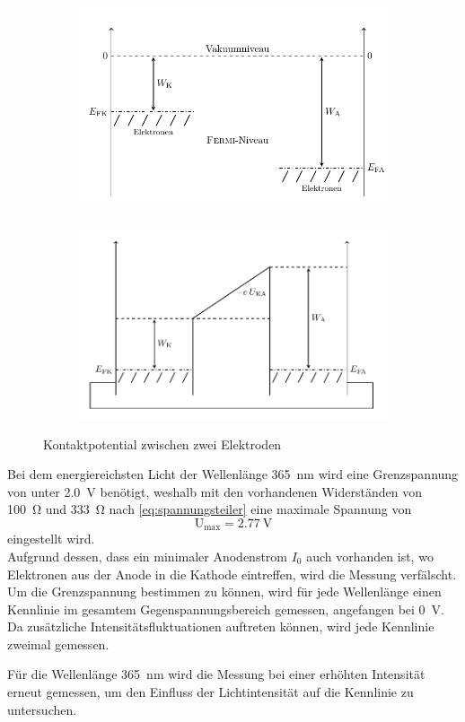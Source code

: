 \begin{figure}[htb]
	\centering
	\begin{subfigure}[c]{0.46\linewidth}
		\includegraphics[width=\linewidth]{../figs/fermi1.png}
	\end{subfigure}
	\begin{subfigure}[c]{0.46\linewidth}
		\includegraphics[width=\linewidth]{../figs/fermi2.png}
	\end{subfigure}
	\caption{Kontaktpotential zwischen zwei Elektroden\cite{skript}}
\end{figure}

Bei dem energiereichsten Licht der Wellenlänge \SI{365}{\nano\meter} wird eine Grenzspannung von unter
\SI{2.0}{\volt} benötigt, weshalb mit den vorhandenen Widerständen von \SI{100}{\ohm} und \SI{333}{\ohm}
nach \cref{eq:spannungsteiler} eine maximale Spannung von
\[\mathrm U_\mathrm{max} = \SI{2.77}{\volt}\]
eingestellt wird.\\
Aufgrund dessen, dass ein minimaler Anodenstrom $I_0$ auch vorhanden ist, wo Elektronen aus der
Anode in die Kathode eintreffen, wird die Messung verfälscht. Um die Grenzspannung bestimmen zu können,
wird für jede Wellenlänge einen Kennlinie im gesamtem Gegenspannungsbereich gemessen, angefangen
bei \SI{0}{\volt}. Da zusätzliche Intensitätsfluktuationen auftreten können, wird jede Kennlinie
zweimal gemessen.\\\par
Für die Wellenlänge \SI{365}{\nano\meter} wird die Messung bei einer erhöhten Intensität
erneut gemessen, um den Einfluss der Lichtintensität auf die Kennlinie zu untersuchen.

